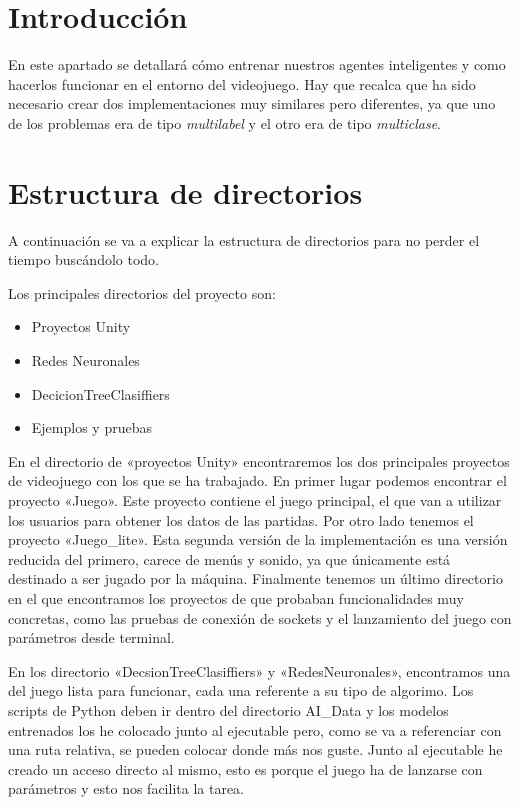
\section{Introducción}
En este apartado se detallará cómo entrenar nuestros agentes inteligentes y como hacerlos funcionar en el entorno del videojuego. Hay que recalca que ha sido necesario crear dos implementaciones muy similares pero diferentes, ya que uno de los problemas era de tipo \emph{multilabel} y el otro era de tipo \emph{multiclase}.

\section{Estructura de directorios}
A continuación se va a explicar la estructura de directorios para no perder el tiempo buscándolo todo.

Los principales directorios del proyecto son:
\begin{itemize}
    \item Proyectos Unity
    \item Redes Neuronales
    \item DecicionTreeClasiffiers
    \item Ejemplos y pruebas
\end{itemize}

En el directorio de «proyectos Unity»  encontraremos los dos principales proyectos de videojuego con los que se ha trabajado. En primer lugar podemos encontrar el proyecto «Juego». Este proyecto contiene el juego principal, el que van a utilizar los usuarios para obtener los datos de las partidas. Por otro lado tenemos el proyecto «Juego\_lite». Esta segunda versión de la implementación es una versión reducida del primero, carece de menús y sonido, ya que únicamente está destinado a ser jugado por la máquina. Finalmente tenemos un último directorio en el que encontramos los proyectos de que probaban funcionalidades muy concretas, como las pruebas de conexión de sockets y el lanzamiento del juego con parámetros desde terminal.

En los directorio «DecsionTreeClasiffiers» y «RedesNeuronales», encontramos una  del juego lista para funcionar, cada una referente a su tipo de algorimo. Los scripts de Python deben ir dentro del directorio AI\_Data y los modelos entrenados los he colocado junto al ejecutable pero, como se va a referenciar con una ruta relativa, se pueden colocar donde más nos guste. Junto al ejecutable he creado un acceso directo al mismo, esto es porque el juego ha de lanzarse con parámetros y esto nos facilita la tarea.

